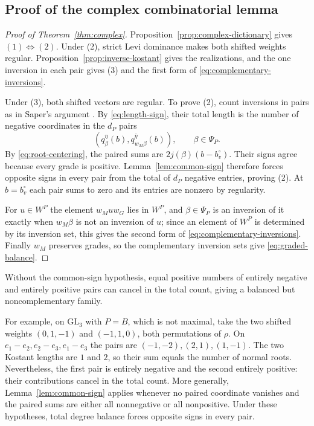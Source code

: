 \documentclass[12pt]{amsart}
\numberwithin{equation}{section}
\theoremstyle{plain}
\theoremstyle{definition}
\theoremstyle{remark}
\renewcommand{\bar}{\overline}
\newcommand{\GL}{\mathrm{GL}}
\begin{document}
\subsection{Proof of the complex combinatorial lemma}
\begin{proof}[Proof of Theorem~\ref{thm:complex}]
Proposition~\ref{prop:complex-dictionary} gives $(1)\Leftrightarrow(2)$. Under (2), strict Levi dominance makes both shifted weights regular. Proposition~\ref{prop:inverse-kostant} gives the realizations, and the one inversion in each pair gives (3) and the first form of \eqref{eq:complementary-inversions}. 

Under (3), both shifted vectors are regular. To prove (2), count inversions in pairs as in Saper's argument \cite[Lemma~17.6]{SaperMicro}. By \eqref{eq:length-sign}, their total length is the number of negative coordinates in the $d_P$ pairs 
\[
 (q^\eta_\beta(b),q^{\bar\eta}_{w_M\beta}(b)),\qquad\beta\in\Psi_P.
\]
By \eqref{eq:root-centering}, the paired sums are $2j(\beta)(b-b_v^\circ)$. Their signs agree because every grade is positive. Lemma~\ref{lem:common-sign} therefore forces opposite signs in every pair from the total of $d_P$ negative entries, proving (2). At $b=b_v^\circ$ each pair sums to zero and its entries are nonzero by regularity.

For $u\in W^P$ the element $w_Muw_G$ lies in $W^P$, and $\beta\in\Psi_P$ is an inversion of it exactly when $w_M\beta$ is not an inversion of $u$; since an element of $W^P$ is determined by its inversion set, this gives the second form of \eqref{eq:complementary-inversions}. Finally $w_M$ preserves grades, so the complementary inversion sets give \eqref{eq:graded-balance}.
\end{proof}

Without the common-sign hypothesis, equal positive numbers of entirely negative and entirely positive pairs can cancel in the total count, giving a balanced but noncomplementary family. 

For example, on $\GL_3$ with $P=B$, which is not maximal, take the two shifted weights $(0,1,-1)$ and $(-1,1,0)$, both permutations of $\rho$. On $e_1-e_2,e_2-e_3,e_1-e_3$ the pairs are $(-1,-2),(2,1),(1,-1)$. The two Kostant lengths are $1$ and $2$, so their sum equals the number of normal roots. Nevertheless, the first pair is entirely negative and the second entirely positive: their contributions cancel in the total count. More generally, Lemma~\ref{lem:common-sign} applies whenever no paired coordinate vanishes and the paired sums are either all nonnegative or all nonpositive. Under these hypotheses, total degree balance forces opposite signs in every pair. 
\end{document}
